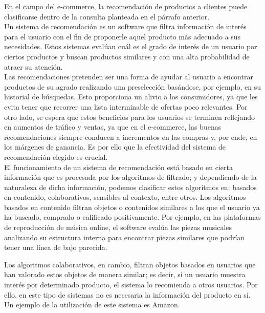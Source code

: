 En el campo del e-commerce, la recomendaci\'on de productos a clientes puede clasificarse dentro de la consulta planteada en el p\'arrafo anterior.\\

Un sistema de recomendaci\'on es un software que filtra informaci\'on de inter\'es para el usuario con el fin de proponerle aquel producto m\'as adecuado a sus necesidades. Estos sistemas eval\'uan cu\'al es el grado de inter\'es de un usuario por ciertos productos y buscan productos similares y con una alta probabilidad de atraer su atenci\'on.\\

Las recomendaciones pretenden ser una forma de ayudar al usuario a encontrar productos de su agrado realizando una preselecci\'on bas\'andose, por ejemplo, en su historial de b\'usquedas. Esto proporciona un alivio a los consumidores, ya que les evita tener que recorrer una lista interminable de ofertas poco relevantes. Por otro lado, se espera que estos beneficios para los usuarios se terminen reflejando en aumentos de tr\'afico y ventas, ya que en el e-commerce, las buenas recomendaciones siempre conducen a incrementos en las compras y, por ende, en los m\'argenes de ganancia. Es por ello que la efectividad del sistema de recomendaci\'on elegido es crucial.\\

El funcionamiento de un sistema de recomendaci\'on est\'a basado en cierta informaci\'on que es procesada por los algoritmos de filtrado; y dependiendo de la naturaleza de dicha informaci\'on, podemos clasificar estos algoritmos en: basados en contenido, colaborativos, sensibles al contexto, entre otros.
Los algoritmos basados en contenido filtran objetos o contenidos similares a los que el usuario ya ha buscado, comprado o calificado positivamente. Por ejemplo, en las plataformas de reproducci\'on de m\'usica online, el software eval\'ua las piezas musicales analizando su estructura interna para encontrar piezas similares que podr\'ian tener una l\'inea de bajo parecida.\

Los algoritmos colaborativos, en cambio, filtran objetos basados en usuarios que han valorado estos objetos de manera similar; es decir, si un usuario muestra inter\'es por determinado producto, el sistema lo recomienda a otros usuarios. Por ello, en este tipo de sistemas no es necesaria la informaci\'on del producto en s\'i. Un ejemplo de la utilizaci\'on de este sistema es Amazon.\\

